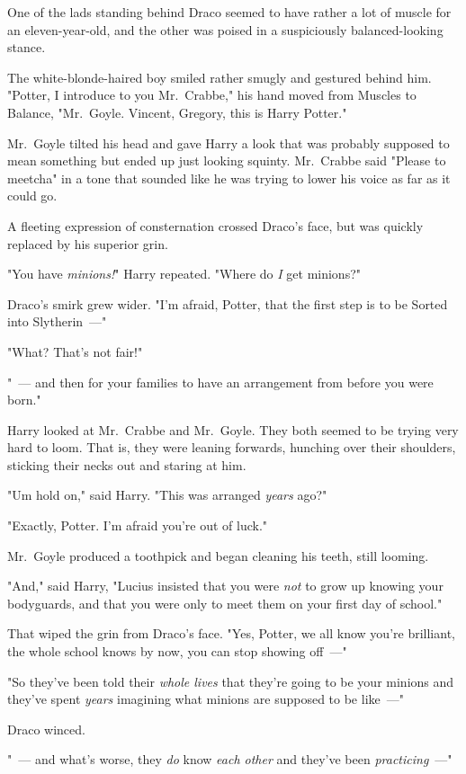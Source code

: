 One of the lads standing behind Draco seemed to have rather a lot of muscle for
an eleven-year-old, and the other was poised in a suspiciously balanced-looking
stance.

The white-blonde-haired boy smiled rather smugly and gestured behind him.
"Potter, I introduce to you Mr.~Crabbe," his hand moved from Muscles to
Balance, "Mr.~Goyle. Vincent, Gregory, this is Harry Potter."

Mr.~Goyle tilted his head and gave Harry a look that was probably supposed to
mean something but ended up just looking squinty. Mr.~Crabbe said "Please to
meetcha" in a tone that sounded like he was trying to lower his voice as far as
it could go.

A fleeting expression of consternation crossed Draco's face, but was quickly
replaced by his superior grin.

"You have \emph{minions!}" Harry repeated. "Where do \emph{I} get minions?"

Draco's smirk grew wider. "I'm afraid, Potter, that the first step is to be
Sorted into Slytherin~---"

"What? That's not fair!"

"~--- and then for your families to have an arrangement from before you were
born."

Harry looked at Mr.~Crabbe and Mr.~Goyle. They both seemed to be trying very
hard to loom. That is, they were leaning forwards, hunching over their
shoulders, sticking their necks out and staring at him.

"Um{\el} hold on," said Harry. "This was arranged \emph{years} ago?"

"Exactly, Potter. I'm afraid you're out of luck."

Mr.~Goyle produced a toothpick and began cleaning his teeth, still looming.

"And," said Harry, "Lucius insisted that you were \emph{not} to grow up knowing
your bodyguards, and that you were only to meet them on your first day of
school."

That wiped the grin from Draco's face. "Yes, Potter, we all know you're
brilliant, the whole school knows by now, you can stop showing off~---"

"So they've been told their \emph{whole lives} that they're going to be your
minions and they've spent \emph{years} imagining what minions are supposed to
be like~---"

Draco winced.

"~--- and what's worse, they \emph{do} know \emph{each other} and they've been
\emph{practicing}~---"

